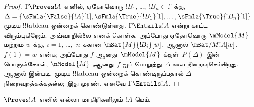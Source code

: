 \documentclass[../../../include/open-logic-section]{subfiles}
\begin{document}
\begin{proof}
  $\Gamma \Proves !A$ எனில், ஏதோவொரு $!B_1$, \dots, $!B_n \in
  \Gamma$ க்கு, $\Delta = \{\sFmla{\False}{!A}[1],
  \sFmla{\True}{!B_1}[1], \dots, \sFmla{\True}{!B_n}[1]\}$ மூடிய
  !!{tableau} ஒன்றைக் கொண்டுள்ளது. $\Gamma \Entails !A$ என்று காட்ட
  விரும்புகிறோம். அவ்வாறில்லை எனக் கொள்க. அப்போது ஏதோவொரு
  $\mModel{M}$ மற்றும் $w$ க்கு, $i=1$, \dots,~$n$ க்கான
  $\mSat{M}{!B_i}[w]$, ஆனால் $\mSat/{M}{!A}[w]$. $f(1) = w$ என்க;
  அப்போது $f$ ஆனது~$\mModel{M}$ க்குள்~$P(\Delta)$ இன் பொருள்கோள்;
  $\mModel{M}$ ஆனது~$f$ ஐப் பொறுத்து~$\Delta$ வை நிறைவுசெய்கிறது.
  ஆனால்  இன்படி, மூடிய !!{tableau} ஒன்றைக்
  கொண்டிருப்பதால் $\Delta$ நிறைவுறத்தக்கதல்ல; இது முரண். எனவே
  $\Gamma \Entails !A$.
\end{proof}

\begin{cor}
$\Proves !A$ எனில் எல்லா மாதிரிகளிலும் $!A$ மெய்.
\end{cor}
\end{document}
